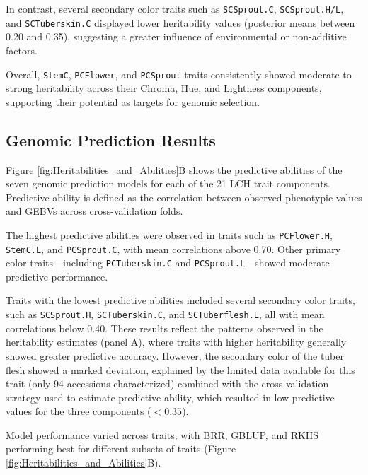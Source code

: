 \documentclass[pdflatex,sn-mathphys-ay]{sn-jnl}%
\begin{document}
In contrast, several secondary color traits such as \texttt{SCSprout.C}, \texttt{SCSprout.H/L}, and \texttt{SCTuberskin.C} displayed lower heritability values (posterior means between 0.20 and 0.35), suggesting a greater influence of environmental or non-additive factors.

Overall, \texttt{StemC}, \texttt{PCFlower}, and \texttt{PCSprout} traits consistently showed moderate to strong heritability across their Chroma, Hue, and Lightness components, supporting their potential as targets for genomic selection.

\subsection{Genomic Prediction Results}
Figure \ref{fig:Heritabilities_and_Abilities}B shows the predictive abilities of the seven genomic prediction models for each of the 21 LCH trait components. Predictive ability is defined as the correlation between observed phenotypic values and GEBVs across cross-validation folds.

The highest predictive abilities were observed in traits such as \texttt{PCFlower.H}, \texttt{StemC.L}, and \texttt{PCSprout.C}, with mean correlations above 0.70. Other primary color traits---including \texttt{PCTuberskin.C} and \texttt{PCSprout.L}---showed moderate predictive performance.

Traits with the lowest predictive abilities included several secondary color traits, such as \texttt{SCSprout.H}, \texttt{SCTuberskin.C}, and \texttt{SCTuberflesh.L}, all with mean correlations below 0.40. These results reflect the patterns observed in the heritability estimates (panel A), where traits with higher heritability generally showed greater predictive accuracy. However, the secondary color of the tuber flesh showed a marked deviation, explained by the limited data available for this trait (only 94 accessions characterized) combined with the cross-validation strategy used to estimate predictive ability, which resulted in low predictive values for the three components ($<0.35$).

Model performance varied across traits, with BRR, GBLUP, and RKHS performing best for different subsets of traits (Figure \ref{fig:Heritabilities_and_Abilities}B).
\end{document}
